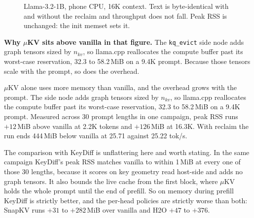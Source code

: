 \documentclass[11pt]{article}
\begin{document}
\begin{figure}[h]\centering
{}
\caption{Llama-3.2-1B, phone CPU, 16K context. Text is byte-identical with and without the
reclaim and throughput does not fall. Peak RSS is unchanged: the init memset sets it.}
\label{fig:rss}
\end{figure}

\noindent\textbf{Why $\mu$KV sits above vanilla in that figure.} The \texttt{kq\_evict} side
node adds graph tensors sized by $n_{kv}$, so llama.cpp reallocates the compute buffer past its
worst-case reservation, 32.3 to 58.2\,MiB on a 9.4K prompt. Because those tensors scale with
the prompt, so does the overhead.

$\mu$KV alone uses more memory than vanilla, and the overhead grows with the prompt. The side
node adds graph tensors sized by $n_{kv}$, so llama.cpp reallocates the compute buffer past its
worst-case reservation, 32.3 to 58.2\,MiB on a 9.4K prompt. Measured across 30 prompt lengths
in one campaign, peak RSS runs $+12$\,MiB above vanilla at 2.2K tokens and $+126$\,MiB at
16.3K. With reclaim the run ends 444\,MiB below vanilla at 25.71 against 25.22 tok/s.

The comparison with KeyDiff is unflattering here and worth stating. In the same campaign
KeyDiff's peak RSS matches vanilla to within 1\,MiB at every one of those 30 lengths, because
it scores on key geometry read host-side and adds no graph tensors. It also bounds the live
cache from the first block, where $\mu$KV holds the whole prompt until the end of prefill. So
on memory during prefill KeyDiff is strictly better, and the per-head policies are strictly
worse than both: SnapKV runs $+31$ to $+282$\,MiB over vanilla and H2O $+47$ to $+376$.
\end{document}
